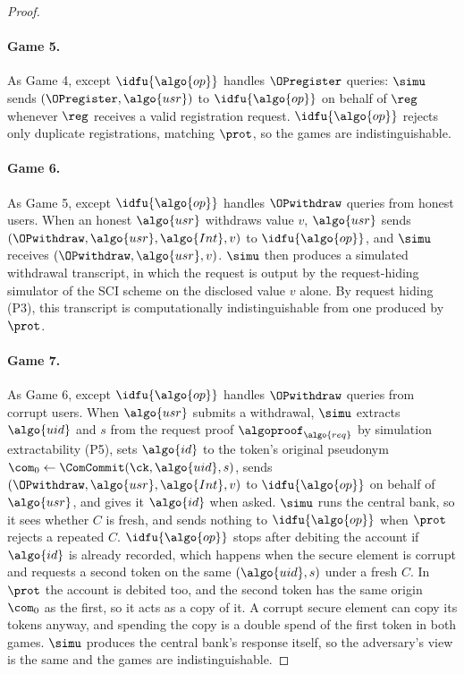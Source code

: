 \begin{proof}
\paragraph{Game 5.} As Game 4, except $\idfu{\algo{op}}$ handles $\OPregister$
queries: $\simu$ sends $(\OPregister, \algo{usr})$ to $\idfu{\algo{op}}$ on
behalf of $\reg$ whenever $\reg$ receives a valid registration request.  $\idfu{\algo{op}}$
rejects only duplicate registrations, matching $\prot$, so the games are
indistinguishable.

\paragraph{Game 6.} As Game 5, except $\idfu{\algo{op}}$ handles $\OPwithdraw$
queries from honest users. When an honest $\algo{usr}$ withdraws value $v$,
$\algo{usr}$ sends $(\OPwithdraw, \algo{usr}, \algo{Int}, v)$ to
$\idfu{\algo{op}}$, and $\simu$ receives $(\OPwithdraw, \algo{usr}, v)$. $\simu$
then produces a simulated withdrawal transcript, in which the request is output
by the request-hiding simulator of the SCI scheme on the disclosed value $v$
alone. By request hiding (P3), this transcript is computationally
indistinguishable from one produced by $\prot$.

\paragraph{Game 7.} As Game 6, except $\idfu{\algo{op}}$ handles $\OPwithdraw$
queries from corrupt users. When $\algo{usr}$ submits a withdrawal, $\simu$
extracts $\algo{uid}$ and $s$ from the request proof
$\algoproof_{\algo{req}}$ by simulation extractability (P5), sets
$\algo{id}$ to the token's original pseudonym $\com_0 \leftarrow \ComCommit(\ck,\allowbreak
\algo{uid},\allowbreak s)$, sends $(\OPwithdraw, \algo{usr}, \algo{Int}, v)$ to
$\idfu{\algo{op}}$ on behalf of $\algo{usr}$, and gives it $\algo{id}$ when asked.
$\simu$ runs the central bank, so it sees whether $C$ is fresh, and sends
nothing to $\idfu{\algo{op}}$ when $\prot$ rejects a repeated $C$.
$\idfu{\algo{op}}$ stops after debiting the account if $\algo{id}$ is already
recorded, which happens when the secure element is corrupt and requests a second
token on the same $(\algo{uid}, s)$ under a fresh $C$. In $\prot$ the account
is debited too, and the second token has the same origin $\com_0$ as the first,
so it acts as a copy of it. A corrupt secure element can copy its tokens anyway,
and spending the copy is a double spend of the first token in both games.
$\simu$ produces the central bank's response itself, so the adversary's view is
the same and the games are indistinguishable.


\end{proof}

